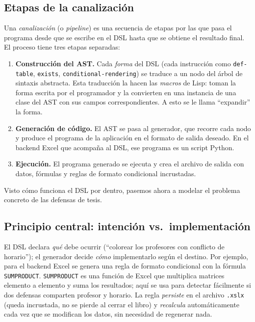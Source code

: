 \documentclass[12pt,a4paper]{report}
\begin{document}
\subsection{Etapas de la canalización}

Una \emph{canalización} (o \emph{pipeline}) es una secuencia de etapas por las
que pasa el programa desde que se escribe en el DSL hasta que se obtiene el
resultado final.  El proceso tiene tres etapas separadas:

\begin{enumerate}
  \item \textbf{Construcción del AST.}  Cada \emph{forma} del DSL
    (cada instrucción como \texttt{def-table}, \texttt{exists},
    \texttt{conditional-rendering}) se traduce a un nodo del árbol de
    sintaxis abstracta.  Esta traducción la hacen las \emph{macros} de
    Lisp: toman la forma escrita por el programador y la convierten en
    una instancia de una clase del AST con sus campos correspondientes.
    A esto se le llama ``expandir'' la forma.

  \item \textbf{Generación de código.}  El AST se pasa al generador,
    que recorre cada nodo y produce el programa de la aplicación en el
    formato de salida deseado.  En el backend Excel que acompaña al DSL,
    ese programa es un script Python.

  \item \textbf{Ejecución.}  El programa generado se ejecuta y crea el
    archivo de salida con datos, fórmulas y reglas de formato condicional
    incrustadas.
\end{enumerate}

Visto cómo funciona el DSL por dentro, pasemos ahora a modelar el problema
concreto de las defensas de tesis.

\subsection{Principio central: intención vs.\ implementación}

El DSL declara \emph{qué} debe ocurrir (``colorear los profesores con
conflicto de horario''); el generador decide \emph{cómo} implementarlo
según el destino.  Por ejemplo, para el backend Excel se genera una
regla de formato condicional con la fórmula \texttt{SUMPRODUCT}.
\texttt{SUMPRODUCT} es una función de Excel que multiplica matrices
elemento a elemento y suma los resultados; aquí se usa para detectar
fácilmente si dos defensas comparten profesor y horario.  La regla
\emph{persiste} en el archivo \texttt{.xslx} (queda incrustada, no se
pierde al cerrar el libro) y \emph{recalcula} automáticamente cada vez
que se modifican los datos, sin necesidad de regenerar nada.
\end{document}
